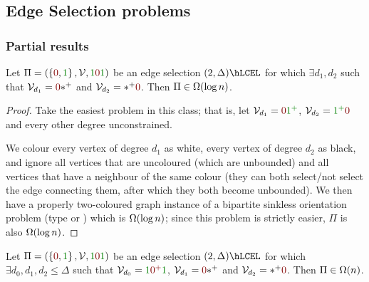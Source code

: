 \documentclass[12pt,a4paper]{article}
\begin{document}
\subsection{Edge Selection problems}
\subsubsection{Partial results}
\begin{lem}\label{lem:es-lb-log}
    Let $\Pi=(\Set{\n,\y},\Vc,\y\n\y)$ be an edge selection $(2,\Delta)\hLCEL$ for which $\exists d_1,d_2$ such that $\Vc_{d_1}=\n\xpl$ and $\Vc_{d_2}=\xpl\n$. Then $\Pi\in\Omega(\log n)$.
\end{lem}
\begin{proof}
    Take the easiest problem in this class; that is, let $\Vc_{d_1}=\n\ypl$, $\Vc_{d_2}=\ypl\n$ and every other degree unconstrained.
    
    We colour every vertex of degree $d_1$ as white, every vertex of degree $d_2$ as black, and ignore all vertices that are uncoloured (which are unbounded) and all vertices that have a neighbour of the same colour (they can both select/not select the edge connecting them, after which they both become unbounded). We then have a properly two-coloured graph instance of a bipartite sinkless orientation problem (type  or ) which is $\Omega(\log n)$; since this problem is strictly easier, $\Pi$ is also $\Omega(\log n)$.
\end{proof}
\begin{lem}\label{lem:es-101}
    Let $\Pi=(\Set{\n,\y},\Vc,\y\n\y)$ be an edge selection $(2,\Delta)\hLCEL$ for which $\exists d_0,d_1,d_2\leq\Delta$ such that $\Vc_{d_0}=\y\npl\y$, $\Vc_{d_1}=\n\xpl$ and $\Vc_{d_2}=\xpl\n$. Then $\Pi\in\Omega(n)$.
\end{lem}
\end{document}
